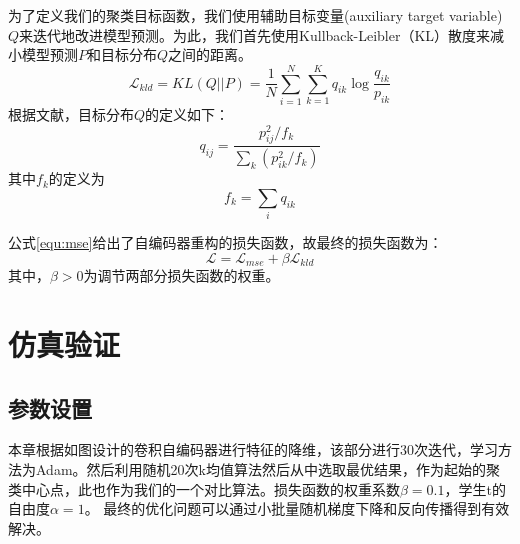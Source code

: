 为了定义我们的聚类目标函数，我们使用辅助目标变量(auxiliary target variable)$Q$来迭代地改进模型预测。为此，我们首先使用Kullback-Leibler（KL）散度来减小模型预测$P$和目标分布$Q$之间的距离。
\begin{equation}
\mathscr{L}_{kld}=KL(Q||P)=\frac{1}{N}\sum_{i=1}^{N}\sum_{k=1}^{K}q_{ik}\log{\frac{q_{ik}}{p_{ik}}}
\label{equ:kldfirst}
\end{equation}
根据文献\cite{xie2016unsupervised}，目标分布$Q$的定义如下：
\begin{equation}
	q_{ij}=\frac{p_{ij}^2/f_k}{\sum_k(p_{ik}^2/f_k)}
\end{equation}
其中$f_k$的定义为
\begin{equation}
	f_k=\sum_iq_{ik}
\end{equation}

公式\ref{equ:mse}给出了自编码器重构的损失函数，故最终的损失函数为：
\begin{equation}
	\mathscr{L}=\mathscr{L}_{mse}+\beta \mathscr{L}_{kld}
\end{equation}
其中，$\beta > 0$为调节两部分损失函数的权重。

\section{仿真验证}
\subsection{参数设置}
本章根据如图设计的卷积自编码器进行特征的降维，该部分进行30次迭代，学习方法为Adam。然后利用随机20次k均值算法然后从中选取最优结果，作为起始的聚类中心点，此也作为我们的一个对比算法。损失函数的权重系数$\beta = 0.1$，学生t的自由度$\alpha = 1$。
最终的优化问题可以通过小批量随机梯度下降和反向传播得到有效解决。

